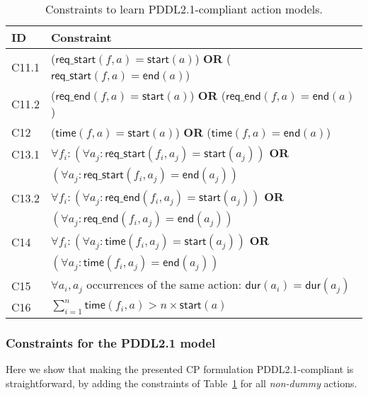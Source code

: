 \documentclass{ecai}
\newcommand{\dur}{\mathsf{dur}}    %
\newcommand{\start}{\mathsf{start}}%
\newcommand{\en}{\mathsf{end}}     %
\newcommand{\tim}{\mathsf{time}}   %
\newcommand{\reqs}{\mathsf{req\_{start}}} %
\newcommand{\reqe}{\mathsf{req\_{end}}}   %
\begin{document}
\begin{table}
\begin{center}   
\caption{Constraints to learn PDDL2.1-compliant action models.}	
\begin{scriptsize}
\begin{tabular}{p{0.4cm}p{7cm}}
\hline	
{\bf ID} &{\bf Constraint} \\ %
\hline
C11.1& ($\reqs(f,a) = \start(a)$) \textbf{OR} ($\reqs(f,a) = \en(a)$) \\%
C11.2& ($\reqe(f,a) = \start(a)$) \textbf{OR} ($\reqe(f,a) = \en(a)$) \\%
C12& ($\tim(f,a) = \start(a)$) \textbf{OR} ($\tim(f,a) = \en(a)$) \\ %
C13.1& $\forall f_i: (\forall a_j: \reqs(f_i,a_j) = \start(a_j))$ \textbf{OR} \\%
&\hspace{0.65cm}$(\forall a_j: \reqs(f_i,a_j) = \en(a_j))$ \\
C13.2& $\forall f_i: (\forall a_j: \reqe(f_i,a_j) = \start(a_j))$ \textbf{OR} \\
&\hspace{0.65cm}$(\forall a_j: \reqe(f_i,a_j) = \en(a_j))$ \\
C14& $\forall f_i: (\forall a_j: \tim(f_i,a_j) = \start(a_j))$ \textbf{OR} \\%
&\hspace{0.65cm}$(\forall a_j: \tim(f_i,a_j) = \en(a_j))$ \\
C15& $\forall a_i,a_j$ occurrences of the same action: $\dur(a_i) = \dur(a_j)$ \\ %
C16 &$\sum_{i=1}^{n} \tim(f_i,a) > n \times \start(a)$ 

\end{tabular}
\end{scriptsize}
\label{table:21constraints}
\end{center}
\end{table}

\subsubsection{Constraints for the PDDL2.1 model}
\label{sec:PDDL21constraints}
Here we show that making the presented CP formulation PDDL2.1-compliant is straightforward, by adding the constraints of Table~\ref{table:21constraints} for all {\em non-dummy} actions.
\end{document}
